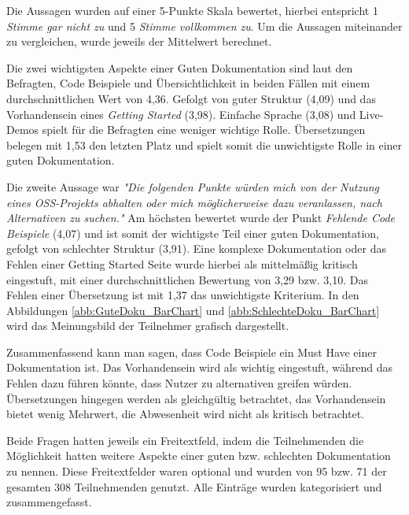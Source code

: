 \bigskip
\noindent
Die Aussagen wurden auf einer 5-Punkte Skala bewertet, hierbei entspricht 1 \textit{Stimme gar nicht zu}
und 5 \textit{Stimme vollkommen zu}. Um die Aussagen miteinander zu vergleichen, wurde jeweils der
Mittelwert berechnet.

Die zwei wichtigsten Aspekte einer Guten Dokumentation sind laut den Befragten, Code Beispiele und
Übersichtlichkeit in beiden Fällen mit einem durchschnittlichen Wert von 4,36. Gefolgt von guter 
Struktur (4,09) und
das Vorhandensein eines \textit{Getting Started} (3,98). Einfache Sprache (3,08) und Live-Demos spielt für
die Befragten eine weniger wichtige Rolle. 
Übersetzungen belegen mit 1,53 den letzten Platz und spielt somit die unwichtigste Rolle in einer 
guten Dokumentation. 


Die zweite Aussage war \textit{"Die folgenden Punkte würden mich von der Nutzung eines OSS-Projekts
    abhalten oder mich möglicherweise dazu veranlassen, nach Alternativen zu suchen."} Am höchsten bewertet
wurde der Punkt \textit{Fehlende Code Beispiele} (4,07) und ist somit der wichtigste Teil einer guten
Dokumentation, gefolgt von schlechter Struktur (3,91). 
Eine komplexe Dokumentation oder das Fehlen einer Getting Started Seite wurde hierbei als mittelmäßig kritisch 
eingestuft, mit einer durchschnittlichen Bewertung von 3,29 bzw. 3,10. Das Fehlen einer Übersetzung ist mit 1,37
das unwichtigste Kriterium.
In den Abbildungen \ref{abb:GuteDoku_BarChart} und
\ref{abb:SchlechteDoku_BarChart} wird das Meinungsbild der Teilnehmer grafisch dargestellt.

Zusammenfassend kann man sagen, dass Code Beispiele ein Must Have einer Dokumentation ist.
Das Vorhandensein wird als wichtig eingestuft, während das Fehlen dazu führen könnte, dass Nutzer
zu alternativen greifen würden. Übersetzungen hingegen werden als gleichgültig betrachtet, das
Vorhandensein bietet wenig Mehrwert, die Abwesenheit wird nicht als kritisch betrachtet.



\bigskip
\noindent
Beide Fragen hatten jeweils ein Freitextfeld, indem die Teilnehmenden die Möglichkeit hatten weitere
Aspekte einer guten bzw. schlechten Dokumentation zu nennen. Diese Freitextfelder waren optional und
wurden von 95 bzw. 71 der gesamten 308 Teilnehmenden genutzt.
Alle Einträge wurden kategorisiert und zusammengefasst.

